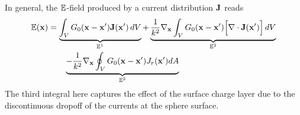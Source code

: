 \documentclass[letterpaper]{article}
\begin{document}
In general, the $\mathbb{E}$-field produced by a current distribution $\mathbf{J}$
reads
\begin{align*}
\mathbb{E}(\mathbf{x})
&= \underbrace{\int_V G_0(\mathbf{x}-\mathbf{x}^\prime) \mathbf{J}(\mathbf{x}^\prime) \, dV}_{\mathbb{E}^1}
  +\underbrace{\frac{1}{k^2}\nabla_{\mathbf{x}}\int_V G_0(\mathbf{x}-\mathbf{x}^\prime)
               \Big[\nabla \cdot \mathbf{J}(\mathbf{x}^\prime)\Big]\,dV
              }_{\mathbb{E}^2}
\\
&\qquad
 \underbrace{
  -\frac{1}{k^2}\nabla_{\mathbf{x}}\oint_V G_0(\mathbf{x}-\mathbf{x}^\prime) J_r(\mathbf{x}^\prime)dA
            }_{\mathbb{E}^3}
\end{align*}
The third integral here captures the effect of the surface charge layer
due to the discontinuous dropoff of the currents at the sphere 
surface.
\end{document}
